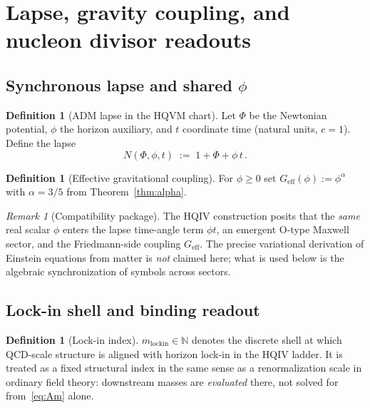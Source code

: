 \documentclass[11pt,a4paper]{article}
\theoremstyle{plain}
\theoremstyle{definition}
\newtheorem{definition}[theorem]{Definition}
\theoremstyle{remark}
\newtheorem{remark}[theorem]{Remark}
\theoremstyle{plain}
\theoremstyle{definition}
\begin{document}
\section{Lapse, gravity coupling, and nucleon divisor readouts}

\subsection{Synchronous lapse and shared $\phi$}

\begin{definition}[ADM lapse in the HQVM chart]\label{def:lapse}
Let $\Phi$ be the Newtonian potential, $\phi$ the horizon auxiliary, and $t$ coordinate time (natural units, $c=1$).
Define the lapse
\begin{equation}\label{eq:lapse}
  N(\Phi,\phi,t) \;:=\; 1+\Phi+\phi\,t\,.
\end{equation}
\end{definition}

\begin{definition}[Effective gravitational coupling]\label{def:Geff}
For $\phi\ge 0$ set $G_{\mathrm{eff}}(\phi):=\phi^{\alpha}$ with $\alpha=3/5$ from Theorem~\ref{thm:alpha}.
\end{definition}

\begin{remark}[Compatibility package]
The HQIV construction posits that the \emph{same} real scalar $\phi$ enters the lapse time-angle term $\phi t$, an emergent O-type Maxwell sector, and the Friedmann-side coupling $G_{\mathrm{eff}}$.
The precise variational derivation of Einstein equations from matter is \emph{not} claimed here; what is used below is the algebraic synchronization of symbols across sectors.
\end{remark}

\subsection{Lock-in shell and binding readout}

\begin{definition}[Lock-in index]
$m_{\mathrm{lockin}}\in\mathbb{N}$ denotes the discrete shell at which QCD-scale structure is aligned with horizon lock-in in the HQIV ladder.
It is treated as a fixed structural index in the same sense as a renormalization scale in ordinary field theory: downstream masses are \emph{evaluated} there, not solved for from~\eqref{eq:Am} alone.
\end{definition}
\end{document}
